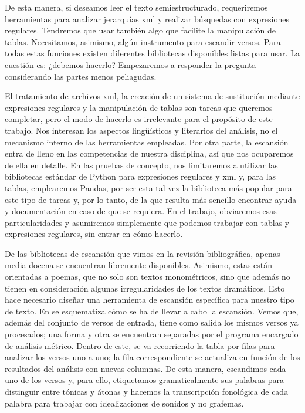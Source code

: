 De esta manera, si deseamos leer el texto semiestructurado, requeriremos herramientas para analizar jerarquías \ac{xml} y realizar búsquedas con expresiones regulares. Tendremos que usar también algo que facilite la manipulación de tablas. Necesitamos, asimismo, algún instrumento para escandir versos. Para todas estas funciones existen diferentes bibliotecas disponibles listas para usar. La cuestión es: ¿debemos hacerlo? Empezaremos a responder la pregunta considerando las partes menos peliagudas.

El tratamiento de archivos \ac{xml}, la creación de un sistema de sustitución mediante expresiones regulares y la manipulación de tablas son tareas que queremos completar, pero el modo de hacerlo es irrelevante para el propósito de este trabajo. Nos interesan los aspectos lingüísticos y literarios del análisis, no el mecanismo interno de las herramientas empleadas. Por otra parte, la escansión entra de lleno en las competencias de nuestra disciplina, así que nos ocuparemos de ella en detalle. En las pruebas de concepto, nos limitaremos a utilizar las bibliotecas estándar de Python para expresiones regulares y \ac{xml} y, para las tablas, emplearemos Pandas, por ser esta tal vez la biblioteca más popular para este tipo de tareas y, por lo tanto, de la que resulta más sencillo encontrar ayuda y documentación en caso de que se requiera. En el trabajo, obviaremos esas particularidades y asumiremos simplemente que podemos trabajar con tablas y expresiones regulares, sin entrar en cómo hacerlo.

De las bibliotecas de escansión que vimos en la revisión bibliográfica, apenas media docena se encuentran libremente disponibles. Asimismo, estas están orientadas a poemas, que no solo son textos monométricos, sino que además no tienen en consideración algunas irregularidades de los textos dramáticos. Esto hace necesario diseñar una herramienta de escansión específica para nuestro tipo de texto. En  se esquematiza cómo se ha de llevar a cabo la escansión. Vemos que, además del conjunto de versos de entrada, tiene como salida los mismos versos ya procesados; una forma y otra se encuentran separadas por el programa encargado de análisis métrico. Dentro de este, se va recorriendo la tabla por filas para analizar los versos uno a uno; la fila correspondiente se actualiza en función de los resultados del análisis con nuevas columnas. De esta manera, escandimos cada uno de los versos y, para ello, etiquetamos gramaticalmente sus palabras para distinguir entre tónicas y átonas y hacemos la transcripción fonológica de cada palabra para trabajar con idealizaciones de sonidos y no grafemas.

